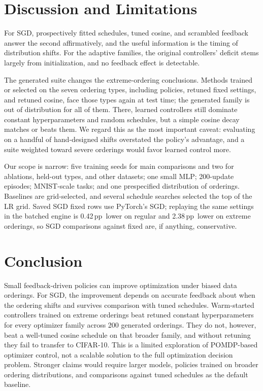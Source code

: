\documentclass{article}
\newcommand{\pp}{\ensuremath{\,\mathrm{pp}}}
\begin{document}
\section{Discussion and Limitations}
For SGD, prospectively fitted schedules, tuned cosine, and scrambled feedback answer the second affirmatively, and the useful information is the timing of distribution shifts. For the adaptive families, the original controllers' deficit stems largely from initialization, and no feedback effect is detectable.

The generated suite changes the extreme-ordering conclusions. Methods trained or selected on the seven ordering types, including policies, retuned fixed settings, and retuned cosine, face those types again at test time; the generated family is out of distribution for all of them. There, learned controllers still dominate constant hyperparameters and random schedules, but a simple cosine decay matches or beats them. We regard this as the most important caveat: evaluating on a handful of hand-designed shifts overstated the policy's advantage, and a suite weighted toward severe orderings would favor learned control more.

Our scope is narrow: five training seeds for main comparisons and two for ablations, held-out types, and other datasets; one small MLP; 200-update episodes; MNIST-scale tasks; and one prespecified distribution of orderings. Baselines are grid-selected, and several schedule searches selected the top of the LR grid. Saved SGD fixed rows use PyTorch's SGD; replaying the same settings in the batched engine is 0.42\pp\ lower on regular and 2.38\pp\ lower on extreme orderings, so SGD comparisons against fixed are, if anything, conservative.

\section{Conclusion}
Small feedback-driven policies can improve optimization under biased data orderings. For SGD, the improvement depends on accurate feedback about when the ordering shifts and survives comparison with tuned schedules. Warm-started controllers trained on extreme orderings beat retuned constant hyperparameters for every optimizer family across 200 generated orderings. They do not, however, beat a well-tuned cosine schedule on that broader family, and without retuning they fail to transfer to CIFAR-10. This is a limited exploration of POMDP-based optimizer control, not a scalable solution to the full optimization decision problem. Stronger claims would require larger models, policies trained on broader ordering distributions, and comparisons against tuned schedules as the default baseline.
\end{document}
